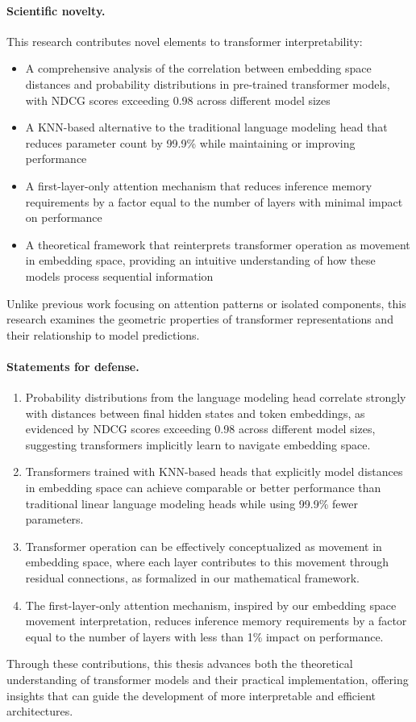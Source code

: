 \paragraph{Scientific novelty.}
This research contributes novel elements to transformer interpretability:
\begin{itemize}
    \item A comprehensive analysis of the correlation between embedding space distances and probability distributions in pre-trained transformer models, with NDCG scores exceeding 0.98 across different model sizes
    
    \item A KNN-based alternative to the traditional language modeling head that reduces parameter count by 99.9\% while maintaining or improving performance
    
    \item A first-layer-only attention mechanism that reduces inference memory requirements by a factor equal to the number of layers with minimal impact on performance
    
    \item A theoretical framework that reinterprets transformer operation as movement in embedding space, providing an intuitive understanding of how these models process sequential information
\end{itemize}
Unlike previous work focusing on attention patterns or isolated components, this research examines the geometric properties of transformer representations and their relationship to model predictions.

\paragraph{Statements for defense.}
\begin{enumerate}
    \item Probability distributions from the language modeling head correlate strongly with distances between final hidden states and token embeddings, as evidenced by NDCG scores exceeding 0.98 across different model sizes, suggesting transformers implicitly learn to navigate embedding space.
    
    \item Transformers trained with KNN-based heads that explicitly model distances in embedding space can achieve comparable or better performance than traditional linear language modeling heads while using 99.9\% fewer parameters.
    
    \item Transformer operation can be effectively conceptualized as movement in embedding space, where each layer contributes to this movement through residual connections, as formalized in our mathematical framework.
    
    \item The first-layer-only attention mechanism, inspired by our embedding space movement interpretation, reduces inference memory requirements by a factor equal to the number of layers with less than 1\% impact on performance.
\end{enumerate}

Through these contributions, this thesis advances both the theoretical understanding of transformer models and their practical implementation, offering insights that can guide the development of more interpretable and efficient architectures.
